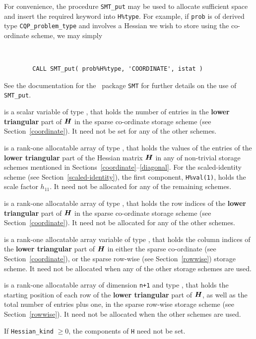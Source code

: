 \documentclass{galahad}
\newcommand{\packagename}{CQP}
\begin{document}
\begin{description}
\begin{description}
For convenience, the procedure {\tt SMT\_put}
may be used to allocate sufficient space and insert the required keyword
into {\tt H\%type}.
For example, if {\tt prob} is of derived type {\tt \packagename\_problem\_type}
and involves a Hessian we wish to store using the co-ordinate scheme,
we may simply
{\tt
\begin{verbatim}
        CALL SMT_put( prob%H%type, 'COORDINATE', istat )
\end{verbatim}
}
\noindent
See the documentation for the \galahad\ package {\tt SMT}
for further details on the use of {\tt SMT\_put}.

 is a scalar variable of type \integer, that
holds the number of entries in the {\bf lower triangular} part of ${\bm{H}}$
in the sparse co-ordinate storage scheme (see Section~\ref{coordinate}).
It need not be set for any of the other schemes.

 is a rank-one allocatable array of type \realdp, that holds
the values of the entries of the {\bf lower triangular} part
of the Hessian matrix ${\bm{H}}$ in any of non-trivial storage schemes
mentioned in Sections~\ref{coordinate}--\ref{diagonal}.
For the scaled-identity scheme (see Section~\ref{scaled-identity}),
the first component, {\tt H\%val(1)}, holds the scale factor $h_{11}$.
It need not be allocated for any of the remaining schemes.

 is a rank-one allocatable array of type \integer,
that holds the row indices of the {\bf lower triangular} part of ${\bm{H}}$
in the sparse co-ordinate storage scheme (see Section~\ref{coordinate}).
It need not be allocated for any of the other schemes.

 is a rank-one allocatable array variable of type \integer,
that holds the column indices of the {\bf lower triangular} part of
${\bm{H}}$ in either the sparse co-ordinate
(see Section~\ref{coordinate}), or the sparse row-wise
(see Section~\ref{rowwise}) storage scheme.
It need not be allocated when any of the other storage schemes are used.

 is a rank-one allocatable array of dimension {\tt n+1} and type
\integer, that holds the starting position of
each row of the {\bf lower triangular} part of ${\bm{H}}$, as well
as the total number of entries plus one, in the sparse row-wise storage
scheme (see Section~\ref{rowwise}). It need not be allocated when the
other schemes are used.
\end{description}
If {\tt Hessian\_kind} $\geq 0$, the components of {\tt H} need not be set.


\end{description}
\end{document}
